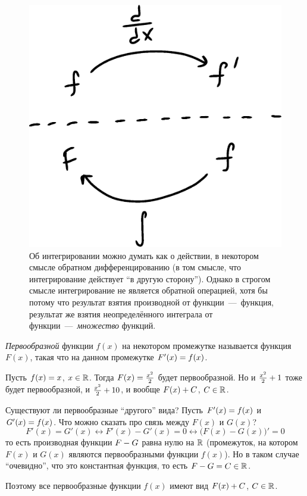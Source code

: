 \documentclass[a4paper,12pt]{article}
\begin{document}
  \begin{figure}[ht]
    \centering
    \includegraphics[width=0.5\linewidth]{images/Diff-Int}
    
    \caption{
      Об интегрировании можно думать как о действии, в некотором смысле обратном дифференцированию (в том смысле, что интегрирование действует ``в другую сторону'').
      Однако в строгом смысле интегрирование не является обратной операцией, хотя бы потому что результат взятия производной от функции~---~функция, результат же взятия неопределённого интеграла от функции~---~\emph{множество} функций.
    }  %
    \label{fig:diff-vs-int}
  \end{figure}
  
  \emph{Первообразной} функции $f(x)$ на некотором промежутке называется функция $F(x)$, такая что на данном промежутке $F'(x) \hm= f(x)$.
  
  \begin{example}
    Пусть $f(x) \hm= x$, $x \hm\in \RR$.
    Тогда $F(x) \hm= \frac{x^2}{2}$ будет первообразной.
    Но и $\frac{x^2}{2} \hm+ 1$ тоже будет первообразной, и $\frac{x^2}{2} \hm+ 10$, и вообще $F(x) \hm+ C$, $C \hm\in \RR$.
    
    Существуют ли первообразные ``другого'' вида?
    Пусть $F'(x) \hm= f(x)$ и $G'(x) \hm= f(x)$.
    Что можно сказать про связь между $F(x)$ и $G(x)$?
    \[
      F'(x) = G'(x) \leftrightarrow F'(x) - G'(x) = 0 \leftrightarrow \bigl(F(x) - G(x)\bigr)' = 0
    \]
    то есть производная функции $F \hm- G$ равна нулю на $\operatorname{\mathbb R}$ (промежуток, на котором $F(x)$ и $G(x)$ являются первообразными функции $f(x)$).
    Но в таком случае ``очевидно'', что это константная функция, то есть $F \hm- G \hm= C \hm\in \RR$.
    
    Поэтому все первообразные функции $f(x)$ имеют вид $F(x) \hm+ C$, $C \hm\in \RR$.
  \end{example}
  
\end{document}
